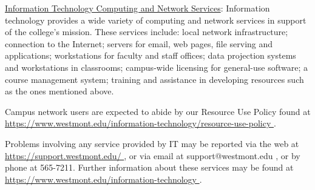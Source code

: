 		\underline{Information Technology Computing and Network Services}:  Information technology provides a wide variety of computing and network services in support of the college's mission.  These services include:  local network infrastructure; connection to the Internet; servers for email, web pages, file serving and applications; workstations for faculty and staff offices; data projection systems and workstations in classrooms; campus-wide licensing for general-use software; a course management system; training and assistance in developing resources such as the ones mentioned above.

		Campus network users are expected to abide by our Resource Use Policy found at
		\href{
			https://www.westmont.edu/information-technology/resource-use-policy
		}{\url{
				https://www.westmont.edu/information-technology/resource-use-policy
			}}
		.

		Problems involving any service provided by IT may be reported via the web at
		\href{
			https://support.westmont.edu/
		}{\url{
				https://support.westmont.edu/
			}}
		,
		or via email at support@westmont.edu
		,
		or by phone at 565-7211.  Further information about these services may be found at
		\href{
			https://www.westmont.edu/information-technology
		}{\url{
				https://www.westmont.edu/information-technology
			}}
		.
